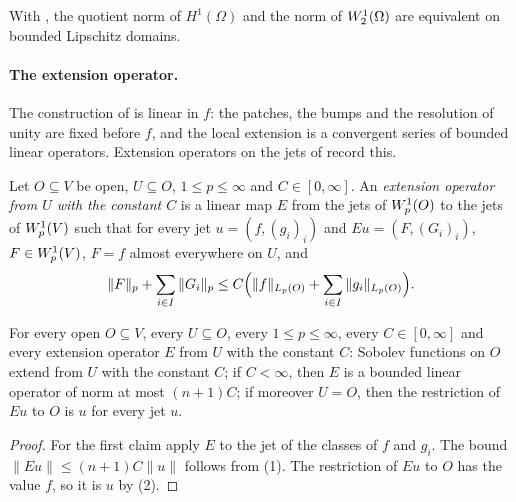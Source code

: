 With , the quotient norm of $H^1(\Omega)$ and the
norm of $W^{1}_{2}(\Omega)$ are equivalent on bounded Lipschitz domains.

\paragraph{The extension operator.}

The construction of  is linear in $f$: the patches, the bumps and the
resolution of unity are fixed before $f$, and the local extension is a convergent series of
bounded linear operators. Extension operators on the jets of  record this.

\begin{definition}
\label{def:sobolev-extension-op}
\leanok
{}
Let $O \subseteq V$ be open, $U \subseteq O$, $1 \leq p \leq \infty$ and $C \in [0, \infty]$. An
\emph{extension operator from $U$ with the constant $C$} is a linear map $E$ from the jets of
$W^{1}_{p}(O)$ to the jets of $W^{1}_{p}(V)$ such that for every jet $u = (f, (g_i)_i)$ and
$E u = (F, (G_i)_i)$, $F \in W^{1}_{p}(V)$, $F = f$ almost everywhere on $U$, and
\[
  \|F\|_p + \sum_{i \in I} \|G_i\|_p \leq C \Bigl(\|f\|_{L_p(O)} + \sum_{i \in I}
  \|g_i\|_{L_p(O)}\Bigr) .
\]
\end{definition}

\begin{lemma}
\label{lem:sobolev-extension-op-bounded}
\leanok
{}
For every open $O \subseteq V$, every $U \subseteq O$, every $1 \leq p \leq \infty$, every
$C \in [0, \infty]$ and every extension operator $E$ from $U$ with the constant $C$: Sobolev
functions on $O$ extend from $U$ with the constant $C$; if $C < \infty$, then $E$ is a bounded
linear operator of norm at most $(n + 1) C$; if moreover $U = O$, then the restriction of $E u$
to $O$ is $u$ for every jet $u$.
\end{lemma}

\begin{proof}
\leanok
For the first claim apply $E$ to the jet of the classes of $f$ and $g_i$. The bound
$\|E u\| \leq (n + 1) C \|u\|$ follows from  (1). The restriction of
$E u$ to $O$ has the value $f$, so it is $u$ by  (2).
\end{proof}

